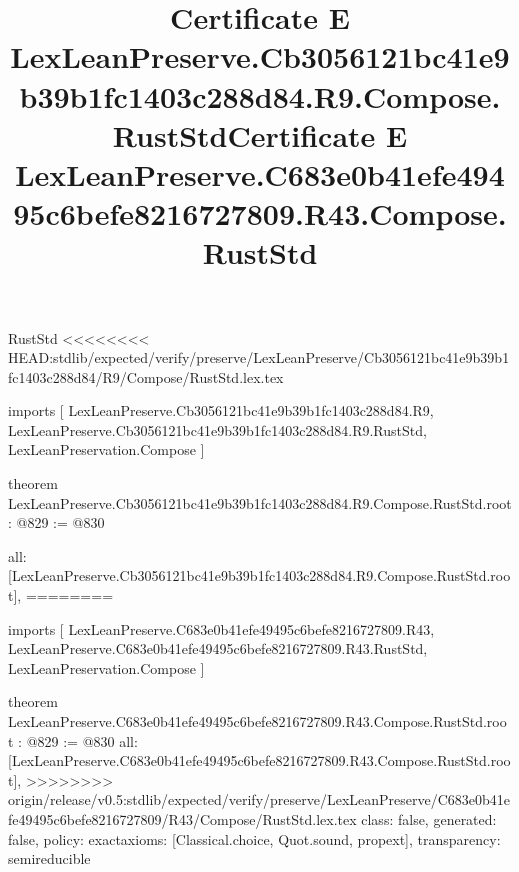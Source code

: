 \begin{lexlean}{RustStd}
<<<<<<<< HEAD:stdlib/expected/verify/preserve/LexLeanPreserve/Cb3056121bc41e9b39b1fc1403c288d84/R9/Compose/RustStd.lex.tex
\title{Certificate E LexLeanPreserve.Cb3056121bc41e9b39b1fc1403c288d84.R9.Compose.RustStd}
\begin{coremodule}
imports [
  LexLeanPreserve.Cb3056121bc41e9b39b1fc1403c288d84.R9,
  LexLeanPreserve.Cb3056121bc41e9b39b1fc1403c288d84.R9.RustStd,
  LexLeanPreservation.Compose
]

theorem LexLeanPreserve.Cb3056121bc41e9b39b1fc1403c288d84.R9.Compose.RustStd.root : @829 := @830 {
  all: [LexLeanPreserve.Cb3056121bc41e9b39b1fc1403c288d84.R9.Compose.RustStd.root],
========
\title{Certificate E LexLeanPreserve.C683e0b41efe49495c6befe8216727809.R43.Compose.RustStd}
\begin{coremodule}
imports [
  LexLeanPreserve.C683e0b41efe49495c6befe8216727809.R43,
  LexLeanPreserve.C683e0b41efe49495c6befe8216727809.R43.RustStd,
  LexLeanPreservation.Compose
]

theorem LexLeanPreserve.C683e0b41efe49495c6befe8216727809.R43.Compose.RustStd.root : @829 := @830 {
  all: [LexLeanPreserve.C683e0b41efe49495c6befe8216727809.R43.Compose.RustStd.root],
>>>>>>>> origin/release/v0.5:stdlib/expected/verify/preserve/LexLeanPreserve/C683e0b41efe49495c6befe8216727809/R43/Compose/RustStd.lex.tex
  class: false,
  generated: false,
  policy: exact{axioms: [Classical.choice, Quot.sound, propext]},
  transparency: semireducible
}


\end{coremodule}}
\end{coremodule}
\end{lexlean}

